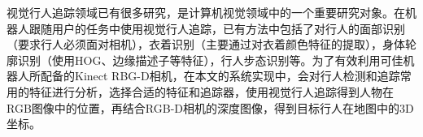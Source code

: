   视觉行人追踪领域已有很多研究，是计算机视觉领域中的一个重要研究对象。在机器人跟随用户的任务中使用视觉行人追踪，已有方法中包括了对行人的面部识别\cite{wong1995mobile,cruz2008rea}（要求行人必须面对相机），衣着识别\cite{bellotto2008multimodal,noceti2009combined}（主要通过对衣着颜色特征的提取），身体轮廓识别\cite{}（使用HOG、边缘描述子等特征），行人步态识别\cite{mowbray2003automatic,koide2016identification}等。为了有效利用可佳机器人所配备的Kinect RBG-D相机，在本文的系统实现中，会对行人检测和追踪常用的特征进行分析，选择合适的特征和追踪器，使用视觉行人追踪得到人物在RGB图像中的位置，再结合RGB-D相机的深度图像，得到目标行人在地图中的3D坐标。


